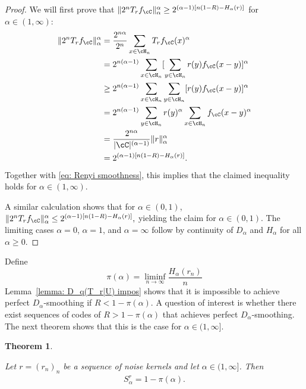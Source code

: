 \documentclass{amsart}
\newtheorem{theorem}{Theorem}[section]
\theoremstyle{remark}
\begin{document}
\begin{proof}
We will first prove that $ \|2^nT_{r}f_\cC\|_{\alpha}^{\alpha} \geq 2^{(\alpha-1)[n(1-R)-H_{\alpha}(r)]} $ for  $\alpha \in (1,\infty)$:
\begin{align*}
    \|2^nT_{r}f_\cC\|_{\alpha}^{\alpha} &= \frac{2^{n\alpha}}{2^n}\sum_{x\in \cH_n}T_{r}f_\cC(x)^{\alpha}\\
    &= 2^{n(\alpha-1)}\sum_{x\in \cH_n}[\sum_{y \in \cH_n}r(y)f_\cC(x-y)]^{\alpha}\\
    &\geq 2^{n(\alpha-1)}\sum_{x\in \cH_n}\sum_{y \in \cH_n}[r(y)f_\cC(x-y)]^{\alpha}\\
    & =  2^{n(\alpha-1)}\sum_{y \in \cH_n}r(y)^{\alpha}\sum_{x\in \cH_n}f_\cC(x-y)^{\alpha}\\
    & =  \frac{2^{n\alpha}}{|\cC|^{(\alpha-1)}}\|r\|_{\alpha}^{\alpha}\\
    & = 2^{(\alpha-1)[n(1-R)-H_{\alpha}(r)]}.
\end{align*}
Together with \eqref{eq: Renyi smoothness}, this implies that the claimed inequality holds for  $\alpha \in (1,\infty)$.

A similar calculation shows that for $\alpha \in (0,1)$, $\|2^nT_{r}f_\cC\|_{\alpha}^{\alpha} \leq 2^{(\alpha-1)[n(1-R)-H_{\alpha}(r)]},$ yielding the claim for $\alpha \in (0,1)$. 
The limiting cases $\alpha =0$, $\alpha =1$, and $\alpha =\infty$ follow by continuity of  $D_{\alpha}$ and $H_{\alpha}$ for all $\alpha\ge 0.$
\end{proof}
Define 
   \begin{equation}\label{eq:pi}
   \pi(\alpha) = \liminf_{n\to\infty}\frac{H_{\alpha}(r_n)}{n}
   \end{equation}
Lemma~\ref{lemma: D_q(T_r|U) impos} shows that it is impossible to achieve perfect $D_{\alpha}$-smoothing if $R < 1-\pi(\alpha).$ A question of interest is whether there exist sequences of codes of $R > 1-\pi(\alpha)$ that achieves perfect $D_{\alpha}$-smoothing. The next theorem shows that this is the case for $\alpha \in (1,\infty]$.

\begin{theorem}\label{thm: General smoothing capacities}

Let $r = (r_n)_n$ be a sequence of noise kernels and let $\alpha \in (1,\infty]$. Then 
\begin{align}\label{eq:sPi}
    S_{\alpha}^{r}= 1-\pi(\alpha).
\end{align} 
\end{theorem}
\end{document}

